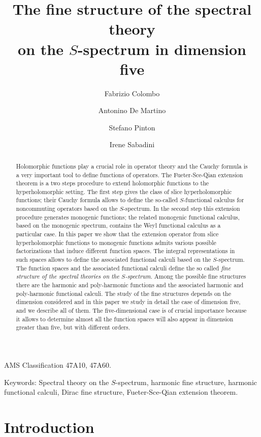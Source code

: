 \documentclass[reqno,11pt]{amsart}
\title[The fine structure of the spectral theory on the $S$-spectrum in dimension five ]{The fine structure of the spectral theory\\ on the $S$-spectrum in dimension five }
\author[F. Colombo]{Fabrizio Colombo}
\author[A. De Martino]{Antonino De Martino}
\author[S. Pinton]{Stefano Pinton}
\author[I. Sabadini]{Irene Sabadini}
\date{}
\numberwithin{equation}{section}
\theoremstyle{definition}
\begin{document}
\maketitle
\begin{abstract}
Holomorphic functions play a crucial role in operator theory and the Cauchy formula is a very important tool to define functions of operators. The Fueter-Sce-Qian extension theorem is a two steps procedure to extend holomorphic functions to the hyperholomorphic setting.
The first step gives the class of slice hyperholomorphic functions;
their Cauchy formula allows to define the so-called $S$-functional calculus for noncommuting operators  based on the $S$-spectrum.
In the second step this extension procedure generates monogenic functions; the
related monogenic functional calculus, based on the monogenic spectrum, contains the Weyl functional calculus as a particular case.
In this paper we show that the extension operator from slice hyperholomorphic
functions to monogenic functions admits various possible factorizations
that induce different function spaces.
The integral representations in such spaces allows to define the associated functional calculi based on the $S$-spectrum.
The function spaces and the associated functional calculi define the so called
{\em fine structure of the spectral theories on the $S$-spectrum}.
Among the possible fine structures there are the harmonic and poly-harmonic functions and the associated harmonic and poly-harmonic functional calculi. The study of the fine structures depends on the dimension considered and in this paper we study in detail the case of dimension five, and we describe all of them.
The five-dimensional case is of crucial importance
because it allows to determine almost all the function spaces 
will also appear in dimension greater than five, but with different orders.



\end{abstract}

\medskip
\noindent AMS Classification 47A10, 47A60.

\noindent Keywords: Spectral theory on the
$S$-spectrum, harmonic fine structure, harmonic functional calculi, Dirac fine structure, Fueter-Sce-Qian extension theorem.

\tableofcontents
\section{Introduction}\label{INTRO}
\end{document}

